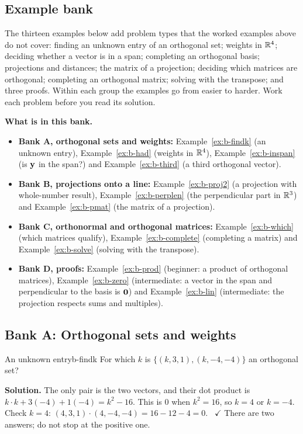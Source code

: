 \documentclass[11pt]{article}
\begin{document}
\subsection*{Example bank}
The thirteen examples below add problem types that the worked examples above do not cover: finding an unknown entry of an orthogonal set; weights in $\mathbb{R}^4$; deciding whether a vector is in a span; completing an orthogonal basis; projections and distances; the matrix of a projection; deciding which matrices are orthogonal; completing an orthogonal matrix; solving with the transpose; and three proofs. Within each group the examples go from easier to harder. Work each problem before you read its solution.

\textbf{What is in this bank.}
\begin{itemize}
  \item \textbf{Bank A, orthogonal sets and weights:} Example~\ref{ex:b-findk} (an unknown entry), Example~\ref{ex:b-had} (weights in $\mathbb{R}^4$), Example~\ref{ex:b-inspan} (is $\mathbf{y}$ in the span?) and Example~\ref{ex:b-third} (a third orthogonal vector).
  \item \textbf{Bank B, projections onto a line:} Example~\ref{ex:b-proj2} (a projection with whole-number result), Example~\ref{ex:b-perplen} (the perpendicular part in $\mathbb{R}^3$) and Example~\ref{ex:b-pmat} (the matrix of a projection).
  \item \textbf{Bank C, orthonormal and orthogonal matrices:} Example~\ref{ex:b-which} (which matrices qualify), Example~\ref{ex:b-complete} (completing a matrix) and Example~\ref{ex:b-solve} (solving with the transpose).
  \item \textbf{Bank D, proofs:} Example~\ref{ex:b-prod} (beginner: a product of orthogonal matrices), Example~\ref{ex:b-zero} (intermediate: a vector in the span and perpendicular to the basis is $\mathbf{0}$) and Example~\ref{ex:b-lin} (intermediate: the projection respects sums and multiples).
\end{itemize}

\subsection*{Bank A: Orthogonal sets and weights}
\begin{exmp}{An unknown entry}{b-findk}
For which $k$ is $\{(k,3,1),(k,-4,-4)\}$ an orthogonal set?

\textbf{Solution.} The only pair is the two vectors, and their dot product is $k\cdot k+3(-4)+1(-4)=k^2-16$. This is $0$ when $k^2=16$, so $k=4$ or $k=-4$. Check $k=4$: $(4,3,1)\cdot(4,-4,-4)=16-12-4=0$. \ $\checkmark$ There are two answers; do not stop at the positive one.
\end{exmp}
\end{document}
